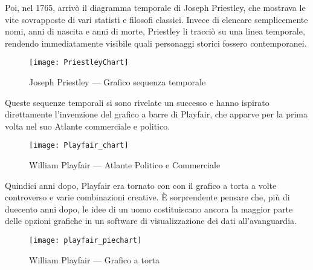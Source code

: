 Poi, nel 1765, arrivò il diagramma temporale di Joseph Priestley, che mostrava le vite sovrapposte di vari statisti e filosofi classici. Invece di elencare semplicemente nomi, anni di nascita e anni di morte, Priestley li tracciò su una linea temporale, rendendo immediatamente visibile quali personaggi storici fossero contemporanei.

\begin{figure}[htp]
    \centering
    \texttt{[image: PriestleyChart]}
    \caption{Joseph Priestley — Grafico sequenza temporale}
    \label{fig:PriestleyChart}
\end{figure}

Queste sequenze temporali si sono rivelate un successo e hanno ispirato direttamente l'invenzione del grafico a barre di Playfair, che apparve per la prima volta nel suo Atlante commerciale e politico.

\begin{figure}[htp]
    \centering
    \texttt{[image: Playfair\_chart]}
    \caption{William Playfair — Atlante Politico e Commerciale}
    \label{fig:playfair_chart}
\end{figure}

Quindici anni dopo, Playfair era tornato con con il grafico a torta a volte controverso e varie combinazioni creative. È sorprendente pensare che, più di duecento anni dopo, le idee di un uomo costituiscano ancora la maggior parte delle opzioni grafiche in un software di visualizzazione dei dati all'avanguardia.

\begin{figure}[htp]
    \centering
    \texttt{[image: playfair\_piechart]}
    \caption{William Playfair — Grafico a torta}
    \label{fig:playfair_piechart}
\end{figure}




